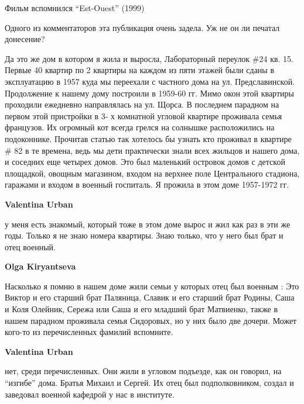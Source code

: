 \begin{itemize}
\begin{itemize}
\end{itemize} %

Фильм вспомнился \enquote{Est-Ouest} (1999)

\begin{itemize} %
Одного из комментаторов эта публикация очень задела. Уж не он ли печатал донесение?
\end{itemize} %


Да это же дом в котором я жила и выросла, Лабораторный переулок \#24 кв. 15.
Первые 40 квартир по 2 квартиры на каждом из пяти этажей были сданы в
эксплуатацию в 1957 куда мы переехали с частного дома на ул. Предславинской.
Продолжение к нашему дому построили в 1959-60 гг. Мимо окон этой квартиры
проходили ежедневно направлялась на ул. Щорса. В последнем парадном на первом
этой пристройки в 3- х комнатной угловой квартире проживала семья французов. Их
огромный кот всегда грелся на солнышке расположились на подоконнике. Прочитав
статью так хотелось бы узнать кто проживал в квартире \# 82 в те времена, ведь
мы дети практически знали всех жильцов и нашего дома, и соседних еще четырех
домов. Это был маленький островок домов с детской площадкой, овощным магазином,
входом на верхнее поле Центрального стадиона, гаражами и входом в военный
госпиталь. Я прожила в этом доме 1957-1972 гг.

\begin{itemize} %
\textbf{Valentina Urban} 

у меня есть знакомый, который тоже в этом доме вырос и жил как раз в эти же
годы. Только я не знаю номера квартиры. Знаю только, что у него был брат и отец
военный.

\begin{itemize} %
\textbf{Olga Kiryantseva} 

Насколько я помню в нашем доме жили семьи у которых отец был военным : Это
Виктор и его старший брат Паляница, Славик и его старший брат Родины, Саша и
Коля Олейник, Сережа или Саша и его младший брат Матвиенко, также в нашем
парадном проживала семья Сидоровых, но у них было две дочери. Может кого-то из
перечисленных фамилий вспомните.

\textbf{Valentina Urban} 

нет, среди перечисленных. Они жили в угловом подъезде, как он говорил, на
\enquote{изгибе} дома. Братья Михаил и Сергей. Их отец был подполковником, создал и
заведовал военной кафедрой у нас в институте.


\end{itemize}
\end{itemize}
\end{itemize}
